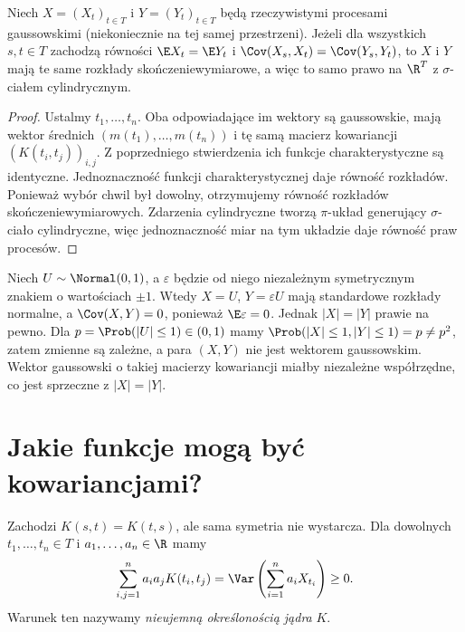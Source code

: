 \begin{twierdzenie}
Niech $X=(X_t)_{t\in T}$ i $Y=(Y_t)_{t\in T}$ będą rzeczywistymi
procesami gaussowskimi (niekoniecznie na tej samej przestrzeni).
Jeżeli dla wszystkich $s,t\in T$ zachodzą równości
$\E X_t=\E Y_t$ i $\Cov(X_s,X_t)=\Cov(Y_s,Y_t)$, to $X$ i $Y$
mają te same rozkłady skończeniewymiarowe, a więc to samo
prawo na $\R^T$ z $\sigma$-ciałem cylindrycznym.
\end{twierdzenie}
\begin{proof}
Ustalmy $t_1,\ldots,t_n$. Oba odpowiadające im wektory są
gaussowskie, mają wektor średnich
$(m(t_1),\ldots,m(t_n))$ i tę samą macierz kowariancji
$(K(t_i,t_j))_{i,j}$. Z poprzedniego stwierdzenia ich funkcje
charakterystyczne są identyczne. Jednoznaczność funkcji
charakterystycznej daje równość rozkładów. Ponieważ wybór chwil był
dowolny, otrzymujemy równość rozkładów skończeniewymiarowych.
Zdarzenia cylindryczne tworzą $\pi$-układ generujący
$\sigma$-ciało cylindryczne, więc jednoznaczność miar
na tym układzie daje równość praw procesów.
\end{proof}

\begin{uwaga}
Niech $U\sim\Normal(0,1)$, a $\varepsilon$ będzie od niego
niezależnym symetrycznym znakiem o wartościach $\pm1$.
Wtedy $X=U$, $Y=\varepsilon U$ mają standardowe rozkłady normalne,
a $\Cov(X,Y)=0$, ponieważ $\E\varepsilon=0$.
Jednak $|X|=|Y|$ prawie na pewno. Dla $p=\Prob(|U|\le1)\in(0,1)$
mamy $\Prob(|X|\le1,|Y|\le1)=p\ne p^2$,
zatem zmienne są zależne,
a para $(X,Y)$ nie jest wektorem gaussowskim.
Wektor gaussowski o takiej macierzy kowariancji miałby niezależne
współrzędne, co jest sprzeczne z $|X|=|Y|$.
\end{uwaga}

\section{Jakie funkcje mogą być kowariancjami?}
Zachodzi $K(s,t)=K(t,s)$, ale sama symetria nie wystarcza.
Dla dowolnych $t_1,\ldots,t_n\in T$ i $a_1,\ldots,a_n\in\R$
mamy
\[
\sum_{i,j=1}^n a_i a_jK(t_i,t_j)
=\Var\left(\sum_{i=1}^n a_iX_{t_i}\right)\ge0.
\]
Warunek ten nazywamy \emph{nieujemną określonością jądra} $K$.


